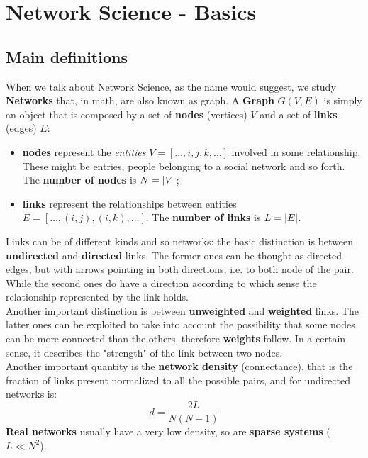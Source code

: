 \documentclass[../main/main.tex]{subfiles}
\begin{document}
\chapter{Network Science - Basics}

\section{Main definitions}

When we talk about Network Science, as the name would suggest, we study \textbf{Networks} that, in math, are also known as graph.
A \textbf{Graph} $G(V,E)$ is simply an object that is composed by a set of \textbf{nodes} (vertices) \( V \) and a set of \textbf{links} (edges) \( E \):
\begin{itemize}
\item \textbf{nodes} represent the \emph{entities} \( V=[\dots,i,j,k,\dots] \) involved in some relationship. These might be entries, people belonging to a social network and so forth. The \textbf{number of nodes} is \( N= \abs{V}  \);

\item \textbf{links} represent the relationships between entities \( E=[\dots,(i,j),(i,k),\dots] \). The \textbf{number of links} is \( L= \abs{E}  \).
\end{itemize}

Links can be of different kinds and so networks: the basic distinction is between \textbf{undirected} and \textbf{directed} links. The former ones can be thought as directed edges, but with arrows pointing in both directions, i.e. to both node of the pair. While the second ones do have a direction according to which sense the relationship represented by the link holds.\\
Another important distinction is between \textbf{unweighted} and \textbf{weighted} links. The latter ones can be exploited to take into account the possibility that some nodes can be more connected than the others, therefore \textbf{weights} follow. In a certain sense, it describes the "strength" of the link between two nodes.\\

Another important quantity is the \textbf{network density} (connectance), that is the fraction of links present normalized to all the possible pairs, and for undirected networks is:
\begin{equation}
  d = \frac{2L}{N(N-1)}
\end{equation}
\textbf{Real networks} usually have a very low density, so are \textbf{sparse systems} (\( L \ll N^2 \)).
\end{document}
